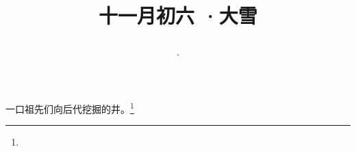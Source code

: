 \title{\date[d=6,m=12,y=2024][year:cn-y,年,month:cn,day:cn,日,·,weekday]·十一月初六 ·大雪}
一口祖先们向后代挖掘的井。\footnote{ }

